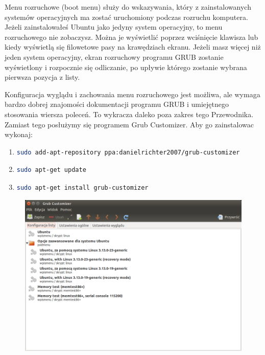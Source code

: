 Menu rozruchowe (boot menu) służy do wskazywania, który z zainstalowanych systemów operacyjnych ma zostać uruchomiony podczas rozruchu komputera. Jeżeli zainstalowałeś Ubuntu jako jedyny system operacyjny, to menu rozruchowego nie zobaczysz. Można je wyświetlić poprzez wciśnięcie klawisza  lub \keys{\arrowkeydown} kiedy wyświetlą się filowetowe pasy na krawędziach ekranu. Jeżeli masz więcej niż jeden system operacyjny, ekran rozruchowy programu GRUB zostanie wyświetlony i rozpocznie się odliczanie, po upływie którego zostanie wybrana pierwsza pozycja z listy.

Konfiguracja wyglądu i zachowania menu rozruchowego jest możliwa, ale wymaga bardzo dobrej znajomości dokumentacji programu GRUB i umiejętnego stosowania wiersza poleceń. To wykracza daleko poza zakres tego Przewodnika. Zamiast tego posłużymy się programem \textcolor{ubuntu_orange}{Grub Customizer}. Aby go zainstalowac wykonaj:
\begin{enumerate}
\item
\begin{lstlisting}[language=bash]
sudo add-apt-repository ppa:danielrichter2007/grub-customizer
\end{lstlisting}
\item
\begin{lstlisting}[language=bash]
sudo apt-get update
\end{lstlisting}
\item
\begin{lstlisting}[language=bash]
sudo apt-get install grub-customizer
\end{lstlisting}
\end{enumerate}

\begin{figure}
	\vspace{-10pt}
	\includegraphics[width=\linewidth]{images/programy_grub_customizer.png}
\end{figure}

